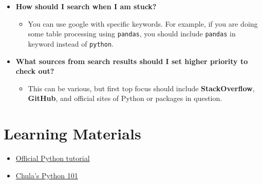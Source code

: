 \documentclass[11pt]{article}
\providecommand{\tightlist}{%
      \setlength{\itemsep}{0pt}\setlength{\parskip}{0pt}}
\begin{document}
\begin{itemize}
\tightlist
\item
  \textbf{How should I search when I am stuck?}

  \begin{itemize}
  \tightlist
  \item
    You can use google with specific keywords. For example, if you are
    doing some table processing using \texttt{pandas}, you should
    include \texttt{pandas} in keyword instead of \texttt{python}.
  \end{itemize}
\item
  \textbf{What sources from search results should I set higher priority
  to check out?}

  \begin{itemize}
  \tightlist
  \item
    This can be various, but first top focus should include
    \textbf{StackOverflow}, \textbf{GitHub}, and official sites of
    Python or packages in question.
  \end{itemize}
\end{itemize}

    \section{Learning Materials}\label{learning-materials}

\begin{itemize}
\tightlist
\item
  \href{https://docs.python.org/3/tutorial/}{Official Python tutorial}
\item
  \href{https://www.cp.eng.chula.ac.th/books/python101/}{Chula's Python
  101}
\end{itemize}


    
    
    
    
\end{document}
